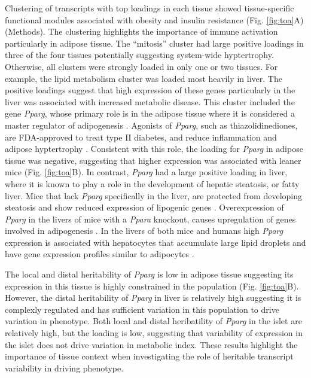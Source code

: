 \documentclass[
]{article}
\begin{document}
Clustering of transcripts with top loadings in each tissue showed
tissue-specific functional modules associated with obesity and insulin
resistance (Fig. \ref{fig:toa}A) (Methods). The clustering highlights
the importance of immune activation particularly in adipose tissue. The
``mitosis'' cluster had large positive loadings in three of the four
tissues potentially suggesting system-wide hyptertrophy. Otherwise, all
clusters were strongly loaded in only one or two tissues. For example,
the lipid metabolism cluster was loaded most heavily in liver. The
positive loadings suggest that high expression of these genes
particularly in the liver was associated with increased metabolic
disease. This cluster included the gene \textit{Pparg}, whose primary
role is in the adipose tissue where it is considered a master regulator
of adipogenesis \cite{pmid17389767}. Agonists of \textit{Pparg}, such as
thiazolidinediones, are FDA-approved to treat type II diabetes, and
reduce inflammation and adipose hyptertrophy \cite{pmid17389767}.
Consistent with this role, the loading for \textit{Pparg} in adipose
tissue was negative, suggesting that higher expression was associated
with leaner mice (Fig. \ref{fig:toa}B). In contrast, \textit{Pparg} had
a large positive loading in liver, where it is known to play a role in
the development of hepatic steatosis, or fatty liver. Mice that lack
\textit{Pparg} specifically in the liver, are protected from developing
steatosis and show reduced expression of lipogenic genes
\cite{pmid12805374, pmid12618528}. Overexpression of \textit{Pparg} in
the livers of mice with a \textit{Ppara} knockout, causes upregulation
of genes involved in adipogenesis \cite{pmid16357043}. In the livers of
both mice and humans high \textit{Pparg} expression is associated with
hepatocytes that accumulate large lipid droplets and have gene
expression profiles similar to adipocytes
\cite{pmid15644454, pmid16403437}.

The local and distal heritability of \textit{Pparg} is low in adipose
tissue suggesting its expression in this tissue is highly constrained in
the population (Fig. \ref{fig:toa}B). However, the distal heritability
of \textit{Pparg} in liver is relatively high suggesting it is complexly
regulated and has sufficient variation in this population to drive
variation in phenotype. Both local and distal heribatility of
\textit{Pparg} in the islet are relatively high, but the loading is low,
suggesting that variability of expression in the islet does not drive
variation in metabolic index. These results highlight the importance of
tissue context when investigating the role of heritable transcript
variability in driving phenotype.
\end{document}
